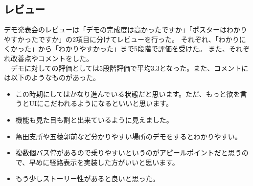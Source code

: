 \documentclass[openany,11pt,papersize]{jsbook}
\begin{document}
\subsection{レビュー}
デモ発表会のレビューは「デモの完成度は高かったですか」「ポスターはわかりやすかったですか」の2項目に分けてレビューを行った。
それぞれ、「わかりにくかった」から「わかりやすかった」まで5段階で評価を受けた。
また、それぞれ改善点やコメントをした。\\
　デモに対しての評価としては5段階評価で平均3.3となった。また、コメントには以下のようなものがあった。
\begin{itemize}

\item この時期にしてはかなり進んでいる状態だと思います。ただ、もっと欲を言うとUIにこだわれるようになるといいと思います。
\item 機能も見た目も割と出来ているように見えました。
\item 亀田支所や五稜郭前など分かりやすい場所のデモをするとわかりやすい。
\item 複数個バス停があるので乗りやすいというのがアピールポイントだと思うので、早めに経路表示を実装した方がいいと思います。
\item もう少しストーリー性があると良いと思った。

\end{itemize}
\end{document}
